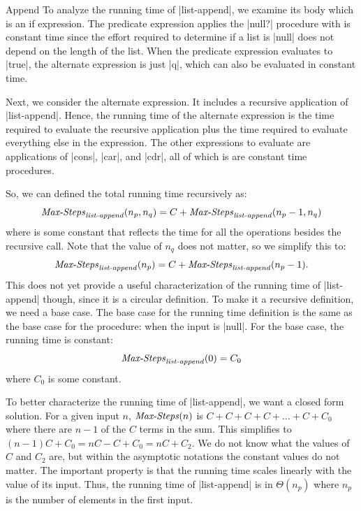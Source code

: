 \begin{schemeregion}
\begin{examplenobar}{Append}
To analyze the running time of \scheme|list-append|, we examine its body which is an if expression.  The predicate expression applies the \scheme|null?| procedure with is constant time since the effort required to determine if a list is \scheme|null| does not depend on the length of the list.  When the predicate expression evaluates to \schemeresult|true|, the alternate expression is just \scheme|q|, which can also be evaluated in constant time.  

Next, we consider the alternate expression.  It includes a recursive application of \scheme|list-append|.  Hence, the running time of the alternate expression is the time required to evaluate the recursive application plus the time required to evaluate everything else in the expression.  The other expressions to evaluate are applications of \scheme|cons|, \scheme|car|, and \scheme|cdr|, all of which is are constant time procedures.  

So, we can defined the total running time recursively as:
\begin{displaymath}
\textrm{\emph{Max-Steps}}_{\textrm{\emph{list-append}}}(n_p, n_q) = C + \textrm{\emph{Max-Steps}}_{\textrm{\emph{list-append}}}(n_p - 1, n_q)
\end{displaymath}
where  is some constant that reflects the time for all the operations besides the recursive call.  Note that the value of $n_q$ does not matter, so we simplify this to:
\begin{displaymath}
\textrm{\emph{Max-Steps}}_{\textrm{\emph{list-append}}}(n_p) = C + \textrm{\emph{Max-Steps}}_{\textrm{\emph{list-append}}}(n_p - 1).
\end{displaymath}
This does not yet provide a useful characterization of the running time of \scheme|list-append| though, since it is a circular definition.  To make it a recursive definition, we need a base case.  The base case for the running time definition is the same as the base case for the procedure: when the input is \scheme|null|.  For the base case, the running time is constant:
\begin{displaymath}
\textrm{\emph{Max-Steps}}_{\textrm{\emph{list-append}}}(0) = C_0
\end{displaymath}
where $C_0$ is some constant.

To better characterize the running time of \scheme|list-append|, we want a closed form solution.  For a given input $n$, $\textrm{\emph{Max-Steps}}(n)$ is $C + C + C + C + \ldots + C + C_0$ where there are $n-1$ of the $C$ terms in the sum.  This simplifies to $(n-1)C + C_0 = nC - C + C_0 = nC + C_2$.  We do not know what the values of $C$ and $C_2$ are, but within the asymptotic notations the constant values do not matter.  The important property is that the running time scales linearly with the value of its input.  Thus, the running time of \scheme|list-append| is in $\Theta(n_p)$ where $n_p$ is the number of elements in the first input.


\end{examplenobar}
\end{schemeregion}
